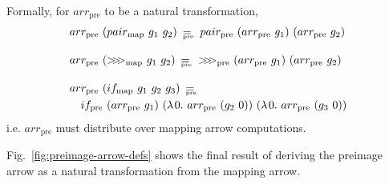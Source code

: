 \documentclass[preprint]{sigplanconf}
\newcommand{\arrowarr}{\ensuremath{arr}}
\newcommand{\arrowcomp}{\ensuremath{{>}\mspace{-6mu}{>}\mspace{-6mu}{>}}}
\newcommand{\arrowpair}{\ensuremath{pair}}
\newcommand{\arrowif}{\ensuremath{if}}
\newcommand{\map}{_\mathrm{map}}
\newcommand{\compmap}{\arrowcomp\map}
\newcommand{\pairmap}{\arrowpair\map}
\newcommand{\ifmap}{\arrowif\map}
\newcommand{\pre}{_\mathrm{pre}}
\DeclareMathOperator{\eqpre}{=_{\mspace{-17mu}\pre}}
\newcommand{\arrpre}{\arrowarr\pre}
\newcommand{\comppre}{\arrowcomp\pre}
\newcommand{\pairpre}{\arrowpair\pre}
\newcommand{\ifpre}{\arrowif\pre}
\begin{document}
Formally, for $\arrpre$ to be a natural transformation,
\begin{align}
	&\begin{aligned}
		\arrpre~(\pairmap~g_1~g_2) \ \eqpre \ \pairpre~(\arrpre~g_1)~(\arrpre~g_2)
	\label{eqn:arrpre-distributes-over-pairmap}
	\end{aligned} \\
\nonumber \\[-6pt]
	&\begin{aligned}
		\arrpre~(\compmap~g_1~g_2) \ \eqpre \ \comppre~(\arrpre~g_1)~(\arrpre~g_2)
	\label{eqn:arrpre-distributes-over-compmap}
	\end{aligned} \\
\nonumber \\[-6pt]
	&\begin{aligned}
		&\arrpre~(\ifmap~g_1~g_2~g_3) \ \eqpre \ \\
		&\tab\ifpre~(\arrpre~g_1)~(\fun{0}{\arrpre~(g_2~0)})~(\fun{0}{\arrpre~(g_3~0)})
	\label{eqn:arrpre-distributes-over-ifmap}
	\end{aligned}
\end{align}
i.e. $\arrpre$ must distribute over mapping arrow computations.

Fig.~\ref{fig:preimage-arrow-defs} shows the final result of deriving the preimage arrow as a natural transformation from the mapping arrow.
\end{document}
